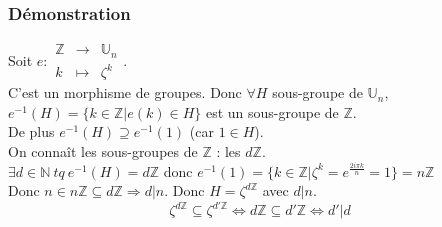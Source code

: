 \documentclass[a4paper, oneside]{report}
\newcommand{\N}{\mathbb{N}}
\newcommand{\Z}{\mathbb{Z}}
\newcommand{\U}{\mathbb{U}}
\begin{document}
\subsubsection{Démonstration}
Soit $e : \begin{array}{lll}
\Z &\rightarrow &\U_n\\
k&\mapsto& \zeta^k
\end{array}$.\\
C'est un morphisme de groupes. Donc $\forall H$ sous-groupe de $\U_n$, $e^{-1}(H)=\{k\in \Z |e(k)\in H \}$ est un sous-groupe de $\Z$.\\
De plus $e^{-1}(H)\supseteq e^{-1}(1)$ (car $1\in H$).\\
On connaît les sous-groupes de $\Z$ : les $d\Z$.\\
$\exists d\in \N~tq~ e^{-1}(H)=d\Z$ donc $e^{-1}(1)=\{k\in \Z | \zeta^k= e^{\frac{2i\pi k}{n}} =1 \}=n\Z$\\
Donc $n\in n\Z \subseteq d\Z \Rightarrow d|n$. Donc $H=\zeta^{d\Z}$ avec $d|n$.
$$\zeta^{d\Z}\subseteq \zeta^{d'\Z}\Leftrightarrow d\Z \subseteq d'\Z \Leftrightarrow d'|d$$
\end{document}
